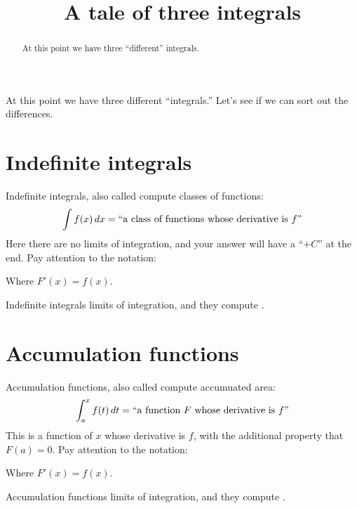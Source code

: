 \documentclass{ximera}
\title[Dig-In:]{A tale of three integrals}
\begin{document}
\begin{abstract}
  At this point we have three ``different'' integrals. 
\end{abstract}
\maketitle

At this point we have three different ``integrals.'' Let's see if we
can sort out the differences.

\section{Indefinite integrals}

Indefinite integrals, also called  compute
classes of functions:
\[
\int f(x) \,d x = \text{``a class of functions whose derivative is $f$''}
\]
Here there are no limits of integration, and your answer will have a
``$+C$'' at the end. Pay attention to the notation:
\begin{center}
\end{center}
Where $F'(x) = f(x)$.
\begin{explanation}%
  Indefinite integrals
   limits of
  integration, and they compute .
\end{explanation}


\section{Accumulation functions}

Accumulation functions, also called  compute accumuated area:
\[
\int_a^x f(t) \,d t = \text{``a function $F$ whose derivative is $f$''}
\]
This is a function of $x$ whose derivative is $f$, with the additional
property that $F(a)=0$.  Pay attention to the notation:
\begin{center}
\end{center}
Where $F'(x) = f(x)$.
\begin{explanation}%
  Accumulation functions  limits of integration, and they compute
  .
\end{explanation}
\end{document}
